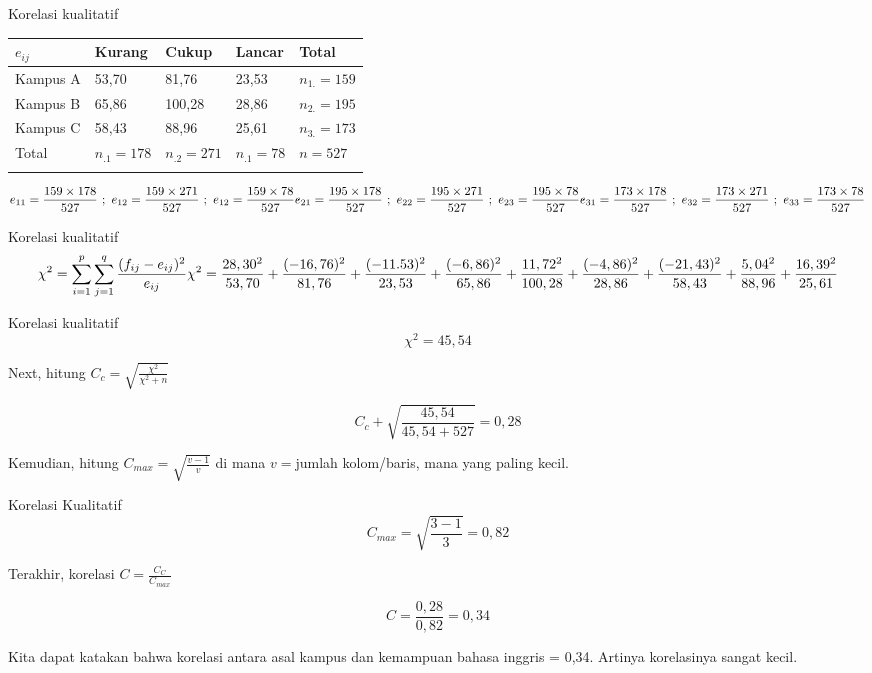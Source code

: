 \documentclass[
  ignorenonframetext,
]{beamer}
\begin{document}
\begin{frame}{Korelasi kualitatif}
\label{korelasi-kualitatif-2}
\begin{longtable}[]{@{}lllll@{}}
\toprule\noalign{}
\(e_{ij}\) & Kurang & Cukup & Lancar & Total \\
\midrule\noalign{}
\endhead
Kampus A & 53,70 & 81,76 & 23,53 & \(n_{1.}=159\) \\
Kampus B & 65,86 & 100,28 & 28,86 & \(n_{2.}=195\) \\
Kampus C & 58,43 & 88,96 & 25,61 & \(n_{3.}=173\) \\
Total & \(n_{.1}=178\) & \(n_{.2}=271\) & \(n_{.1}=78\) & \(n=527\) \\
\bottomrule\noalign{}
\end{longtable}

\[
e_{11}=\frac{159 \times 178}{527} \ ; \ e_{12}=\frac{159 \times 271}{527} \ ; \ e_{12}=\frac{159 \times 78}{527} \\ e_{21}=\frac{195 \times 178}{527} \ ; \ e_{22}=\frac{195 \times 271}{527} \ ; \ e_{23}=\frac{195 \times 78}{527} \\ e_{31}=\frac{173 \times 178}{527} \ ; \ e_{32}=\frac{173 \times 271}{527} \ ; \ e_{33}=\frac{173 \times 78}{527}
\]
\end{frame}

\begin{frame}{Korelasi kualitatif}
\label{korelasi-kualitatif-3}
\[
\chi^2=\sum_{i=1}^{p} \sum_{j=1}^{q} \frac{(f_{ij}-e_{ij})^2}{e_{ij}} \\ \chi^2=\frac{28,30^2}{53,70}+\frac{(-16,76)^2}{81,76}+\frac{(-11.53)^2}{23,53} \\ +\frac{(-6,86)^2}{65,86}+\frac{11,72^2}{100,28}+\frac{(-4,86)^2}{28,86} \\ +\frac{(-21,43)^2}{58,43}+\frac{5,04^2}{88,96}+\frac{16,39^2}{25,61}
\]
\end{frame}

\begin{frame}{Korelasi kualitatif}
\label{korelasi-kualitatif-4}
\[
\chi^2=45,54
\]

Next, hitung \(C_c=\sqrt{\frac{\chi^2}{\chi^2+n}}\)

\[
C_c+\sqrt{\frac{45,54}{45,54+527}}=0,28
\]

Kemudian, hitung \(C_{max}=\sqrt{\frac{v-1}{v}}\) di mana \(v=\)jumlah
kolom/baris, mana yang paling kecil.
\end{frame}

\begin{frame}{Korelasi Kualitatif}
\label{korelasi-kualitatif-5}
\[
C_{max}=\sqrt{\frac{3-1}{3}}=0,82
\]

Terakhir, korelasi \(C=\frac{C_C}{C_{max}}\)

\[
C=\frac{0,28}{0,82}=0,34
\]

Kita dapat katakan bahwa korelasi antara asal kampus dan kemampuan
bahasa inggris = 0,34. Artinya korelasinya sangat kecil.
\end{frame}
\end{document}
